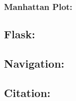 \documentclass[12pt,a4paper]{article}
\begin{document}
{}

{}

{}

\hypertarget{h.5zfnv0ig9q0m}{%
\subsubsection{\texorpdfstring{{Manhattan
Plot:}}{Manhattan Plot:}}\label{h.5zfnv0ig9q0m}}

\hypertarget{h.hwsiupgp3f8i}{%
\subsection{\texorpdfstring{{Flask:}}{Flask:}}\label{h.hwsiupgp3f8i}}

{}

\hypertarget{h.147jjkfr6rv5}{%
\subsection{\texorpdfstring{{Navigation:}}{Navigation:}}\label{h.147jjkfr6rv5}}

{}

\hypertarget{h.fysf9tqgmmsh}{%
\subsection{\texorpdfstring{{Citation:}}{Citation:}}\label{h.fysf9tqgmmsh}}

{}

{}

\hypertarget{h.nrbww7njcv3p}{%
\subsubsection{\texorpdfstring{{}}{}}\label{h.nrbww7njcv3p}}

{}

{}

{}

\hypertarget{h.1yu3kvn20cvs}{%
\section{\texorpdfstring{{}}{}}\label{h.1yu3kvn20cvs}}
\end{document}
